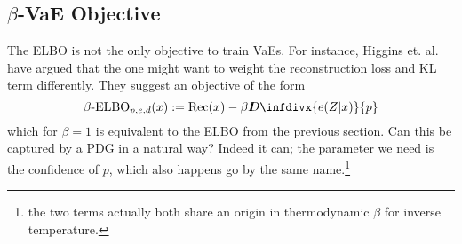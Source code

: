 \documentclass{article}
\theoremstyle{plain}
\theoremstyle{definition}
\newcommand{\thickD}{I\mkern-8muD}
\newcommand{\kldiv}{\thickD\infdivx}
\begin{document}
\subsection{\texorpdfstring{$\beta$}{beta}-VaE Objective}

The ELBO is not the only objective to train VaEs. For instance, Higgins et. al. \cite{higgins2016beta} have argued that the one might want to weight the reconstruction loss and KL term differently.  They suggest an objective of the form
\[ \beta\text{-}\mathrm{ELBO}_{p,e,d}(x) := \mathrm{Rec}(x) - \beta \kldiv{e(Z|x)}{p}\]
which for $\beta = 1$ is equivalent to the ELBO from the previous section. Can this be captured by a PDG in a natural way? Indeed it can; the parameter we need is the confidence of $p$, which also happens go by the same name.\footnote{the two terms actually both share an origin in thermodynamic $\beta$ for inverse temperature.}
\end{document}
